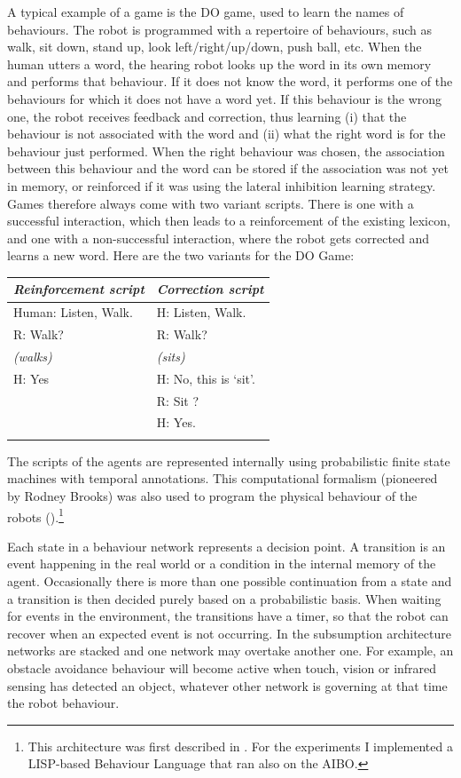 A typical example of a game is the DO game, used to learn the names of behaviours. 
The robot is programmed with a repertoire of behaviours, such as 
walk, sit down, stand up, look left/right/up/down, push ball, etc. When the human utters a word, the hearing robot 
looks up the word in its own memory and performs that behaviour. If it does not know the word, it 
performs one of the behaviours for which it does not have a word yet. 
If this behaviour is the wrong one, the robot receives feedback and correction, 
thus learning (i) that the behaviour is not associated with the word and (ii) what the right word is for the behaviour 
just performed. When the right behaviour was chosen, the association between this behaviour 
and the word can be stored if the association was not yet in memory, or reinforced if it was using the 
lateral inhibition learning strategy. 
Games therefore always come with two variant scripts. There is one with a successful interaction, which then 
leads to a reinforcement of the existing lexicon, and one with a non-successful interaction, where the 
robot gets corrected and learns a new word. Here are the two variants for the DO Game: 
\begin{center}
\begin{tabular}{ l  l }
\lsptoprule
{\itshape Reinforcement script}&{\itshape Correction script} \\ \midrule
Human: Listen, Walk. & H: Listen, Walk.  \\ 
R: Walk? & R: Walk? \\
 {\itshape (walks)} & {\itshape (sits)} \\
H: Yes & H: No, this is `sit'. \\
& R: Sit ? \\ 
& H: Yes. \\ 
\lspbottomrule
\end{tabular}
\end{center}
The scripts of the agents are represented internally using probabilistic finite state machines with 
temporal annotations. This computational formalism (pioneered by Rodney Brooks) was also used to program the 
physical behaviour of the robots ().\footnote{
This architecture was first described in \cite{Brooks:1986}. 
For the experiments I implemented a LISP-based Behaviour Language that ran also on the AIBO.}

Each state in a behaviour network 
represents a decision point. A transition is an event happening in the real world or a condition in 
the internal memory of the agent. Occasionally there is more than one possible continuation from a state 
and a transition is then decided purely based on a probabilistic basis.  
When waiting for events in the environment, the transitions have a timer, so that the robot can recover when an 
expected event is not occurring. In the subsumption architecture networks are stacked and
one network may overtake another one. For example, an obstacle avoidance behaviour will become active when 
touch, vision or infrared sensing has 
detected an object, whatever other network is governing at that time the robot behaviour. 

